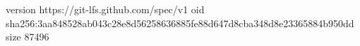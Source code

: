 version https://git-lfs.github.com/spec/v1
oid sha256:3aa848528ab043c28e8d56258636885fe88d647d8cba348d8e23365884b950dd
size 87496
